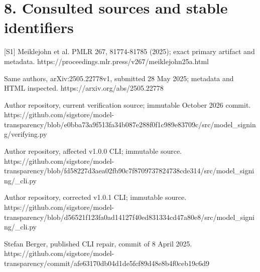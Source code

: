 \documentclass[10pt]{article}
\begin{document}
\section*{8. Consulted sources and stable identifiers}
[S1] Meiklejohn et al. PMLR 267, 81774-81785 (2025); exact primary artifact and metadata. https://proceedings.mlr.press/v267/meiklejohn25a.html\par
Same authors, arXiv:2505.22778v1, submitted 28 May 2025; metadata and HTML inspected. https://arxiv.org/abs/2505.22778\par
Author repository, current verification source; immutable October 2026 commit. https://github.com/sigstore/model-transparency/blob/e0bba73a9f513fa34b087e288f0f1c989e83709c/src/model\_signing/verifying.py\par
Author repository, affected v1.0.0 CLI; immutable source. https://github.com/sigstore/model-transparency/blob/fd58227d3aea02fb90c7f8709737824738cde314/src/model\_signing/\_cli.py\par
Author repository, corrected v1.0.1 CLI; immutable source. https://github.com/sigstore/model-transparency/blob/d56521f123fa0ad14127f40ed831334cd47a80e8/src/model\_signing/\_cli.py\par
Stefan Berger, published CLI repair, commit of 8 April 2025. https://github.com/sigstore/model-transparency/commit/afe63170db04d1de5fcf89d48e8b4f0ceb19c6d9\par
\end{document}
